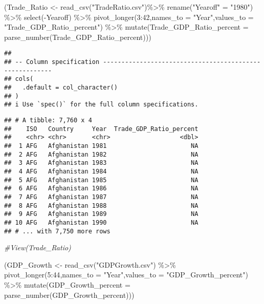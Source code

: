 \documentclass[
]{article}
\newenvironment{Shaded}{\begin{snugshade}}{\end{snugshade}}
\newcommand{\AttributeTok}[1]{\textcolor[rgb]{0.77,0.63,0.00}{#1}}
\newcommand{\CommentTok}[1]{\textcolor[rgb]{0.56,0.35,0.01}{\textit{#1}}}
\newcommand{\DecValTok}[1]{\textcolor[rgb]{0.00,0.00,0.81}{#1}}
\newcommand{\FunctionTok}[1]{\textcolor[rgb]{0.00,0.00,0.00}{#1}}
\newcommand{\NormalTok}[1]{#1}
\newcommand{\OtherTok}[1]{\textcolor[rgb]{0.56,0.35,0.01}{#1}}
\newcommand{\SpecialCharTok}[1]{\textcolor[rgb]{0.00,0.00,0.00}{#1}}
\newcommand{\StringTok}[1]{\textcolor[rgb]{0.31,0.60,0.02}{#1}}
\begin{document}
\begin{Shaded}
\begin{Highlighting}[]
\NormalTok{(Trade\_Ratio }\OtherTok{\textless{}{-}} \FunctionTok{read\_csv}\NormalTok{(}\StringTok{"TradeRatio.csv"}\NormalTok{)}\SpecialCharTok{\%\textgreater{}\%}
  \FunctionTok{rename}\NormalTok{(}\StringTok{"Yearoff"} \OtherTok{=} \StringTok{"1980"}\NormalTok{) }\SpecialCharTok{\%\textgreater{}\%}
  \FunctionTok{select}\NormalTok{(}\SpecialCharTok{{-}}\NormalTok{Yearoff) }\SpecialCharTok{\%\textgreater{}\%}
  \FunctionTok{pivot\_longer}\NormalTok{(}\DecValTok{3}\SpecialCharTok{:}\DecValTok{42}\NormalTok{,}\AttributeTok{names\_to =} \StringTok{"Year"}\NormalTok{,}\AttributeTok{values\_to =} \StringTok{"Trade\_GDP\_Ratio\_percent"}\NormalTok{) }\SpecialCharTok{\%\textgreater{}\%}
  \FunctionTok{mutate}\NormalTok{(}\AttributeTok{Trade\_GDP\_Ratio\_percent =} \FunctionTok{parse\_number}\NormalTok{(Trade\_GDP\_Ratio\_percent)))}
\end{Highlighting}
\end{Shaded}

\begin{verbatim}
## 
## -- Column specification --------------------------------------------------------
## cols(
##   .default = col_character()
## )
## i Use `spec()` for the full column specifications.
\end{verbatim}

\begin{verbatim}
## # A tibble: 7,760 x 4
##    ISO   Country     Year  Trade_GDP_Ratio_percent
##    <chr> <chr>       <chr>                   <dbl>
##  1 AFG   Afghanistan 1981                       NA
##  2 AFG   Afghanistan 1982                       NA
##  3 AFG   Afghanistan 1983                       NA
##  4 AFG   Afghanistan 1984                       NA
##  5 AFG   Afghanistan 1985                       NA
##  6 AFG   Afghanistan 1986                       NA
##  7 AFG   Afghanistan 1987                       NA
##  8 AFG   Afghanistan 1988                       NA
##  9 AFG   Afghanistan 1989                       NA
## 10 AFG   Afghanistan 1990                       NA
## # ... with 7,750 more rows
\end{verbatim}

\begin{Shaded}
\begin{Highlighting}[]
\CommentTok{\#View(Trade\_Ratio)}

\NormalTok{(GDP\_Growth }\OtherTok{\textless{}{-}} \FunctionTok{read\_csv}\NormalTok{(}\StringTok{"GDPGrowth.csv"}\NormalTok{) }\SpecialCharTok{\%\textgreater{}\%}
  \FunctionTok{pivot\_longer}\NormalTok{(}\DecValTok{5}\SpecialCharTok{:}\DecValTok{44}\NormalTok{,}\AttributeTok{names\_to =} \StringTok{"Year"}\NormalTok{,}\AttributeTok{values\_to =} \StringTok{"GDP\_Growth\_percent"}\NormalTok{) }\SpecialCharTok{\%\textgreater{}\%}
  \FunctionTok{mutate}\NormalTok{(}\AttributeTok{GDP\_Growth\_percent =} \FunctionTok{parse\_number}\NormalTok{(GDP\_Growth\_percent)))}
\end{Highlighting}
\end{Shaded}
\end{document}
